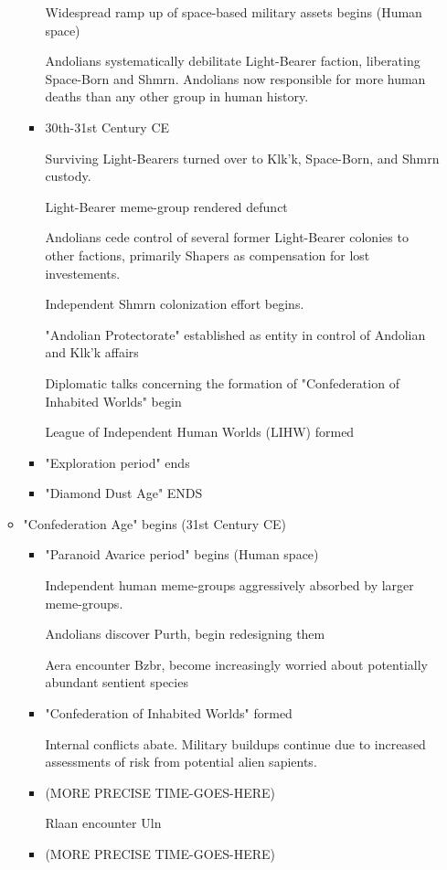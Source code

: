 \begin{itemize}
\begin{itemize}
\begin{itemize}
Widespread ramp up of space-based military assets begins (Human space)

Andolians systematically debilitate Light-Bearer faction, liberating
Space-Born and Shmrn. Andolians now responsible for more human deaths
than any other group in human history.

\item	30th-31st Century CE 

Surviving Light-Bearers turned over to Klk'k, Space-Born, and Shmrn
custody.

Light-Bearer meme-group rendered defunct 

Andolians cede control of several former Light-Bearer colonies to
other factions, primarily Shapers as compensation for lost
investements.

Independent Shmrn colonization effort begins. 

"Andolian Protectorate" established as entity in control of Andolian
and Klk'k affairs

Diplomatic talks concerning the formation of "Confederation of
Inhabited Worlds" begin

League of Independent Human Worlds (LIHW) formed

\item "Exploration period" ends 
\item "Diamond Dust Age" ENDS 
\end{itemize}
\item "Confederation Age" begins (31st Century CE)
\begin{itemize}
\item	"Paranoid Avarice period" begins (Human space) 

Independent human meme-groups aggressively absorbed by larger
meme-groups.

Andolians discover Purth, begin redesigning them

Aera encounter Bzbr, become increasingly worried about potentially
abundant sentient species

\item	"Confederation of Inhabited Worlds" formed 

Internal conflicts abate. Military buildups continue due to increased
assessments of risk from potential alien sapients.

\item	(MORE PRECISE TIME-GOES-HERE) 

Rlaan encounter Uln 
\item	(MORE PRECISE TIME-GOES-HERE) 


\end{itemize}
\end{itemize}
\end{itemize}

